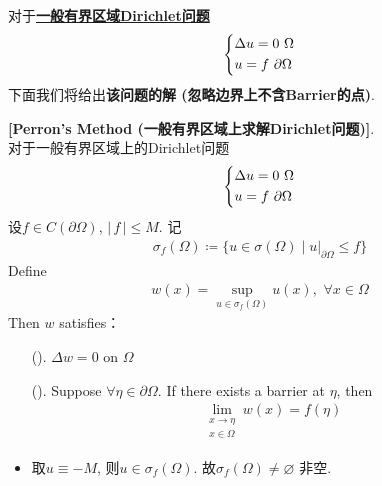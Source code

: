 	\vspace*{6em}
	
	对于\underline{\textbf{一般有界区域Dirichlet问题}}
	\begin{align*}
		\begin{dcases*}
			\Delta u = 0 \,\, \Omega \\
			u = f \,\, \partial \Omega
		\end{dcases*}
	\end{align*}
	下面我们将给出\textbf{该问题的解 (忽略边界上不含Barrier的点)}. 
	
	\newpage
	
	\begin{thm}\label{thm 3.6.5}
		\textbf{[Perron's Method (一般有界区域上求解Dirichlet问题)]}. \\
		对于一般有界区域上的Dirichlet问题
		\begin{align*}
			\begin{dcases*}
				\Delta u = 0 \,\, \Omega \\
				u = f \,\, \partial \Omega
			\end{dcases*}
		\end{align*}
		设$f \in C(\partial \Omega)$, $| \, f \, | \leq M$. 记
		\begin{align*}
			\sigma_{f}(\Omega) \coloneqq \Big\{ u \in \sigma(\Omega) \mid u \Big|_{\partial \Omega} \leq f \Big\}
		\end{align*}
		Define 
		\begin{align*}
			w(x) = \sup_{u \in \sigma_{f}(\Omega)} u(x) , \,\, \forall x \in \Omega
		\end{align*}
		Then $w$ satisfies：
		
		\begin{enumerate}
			\item[(\rmnum{1}).] $\Delta w = 0$ on $\Omega$ 
			
			\item[(\rmnum{2}).] Suppose $\forall \eta \in \partial \Omega$. If there exists a barrier at $\eta$, then
			\begin{align*}
				\lim_{\substack{x \to \eta \\ x \in \Omega}} w(x) = f(\eta)
			\end{align*}
		\end{enumerate}
		
		\vspace*{8em}
		
		\begin{rmk}
			\begin{itemize}
				\item 取$u \equiv -M$, 则$u \in \sigma_{f}(\Omega)$. 故$\sigma_{f}(\Omega) \neq \varnothing$ 非空. 
				

\end{itemize}
\end{rmk}
\end{thm}
